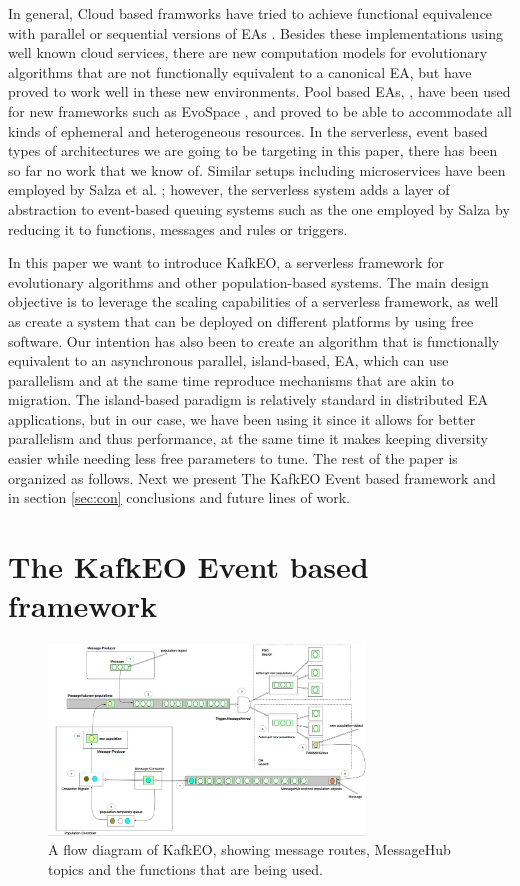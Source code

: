 \documentclass[sigconf]{acmart}
\begin{document}
In general, Cloud based framworks have tried to achieve functional equivalence with parallel or sequential versions of EAs \cite{salza2017ccube,de2017parallel,10.1007/978-3-319-32149-3_46,de2015scalable}. Besides these implementations using well known cloud services, there are new computation models for evolutionary algorithms
that are not functionally equivalent to a canonical EA, but have
proved to work well in these new environments. Pool based EAs,
\cite{bollini1999distributed}, have been used for new
frameworks such as EvoSpace \cite{García-Valdez2015}, and proved to be
able to accommodate all kinds of ephemeral and heterogeneous
resources. In the serverless, event based types of architectures we are going to
be targeting in this paper, there has been so far no work that we know
of. Similar setups including microservices have been employed by Salza et
al. \cite{salza2017ccube}; however, the serverless system adds a layer
of abstraction to event-based queuing systems such as the one employed
by Salza by reducing it to functions, messages and rules or
triggers.

In this paper we want to introduce KafkEO, a serverless framework for
evolutionary algorithms and other population-based systems. The main
design objective is to leverage the scaling capabilities of a
serverless framework, as well as create a system that can be deployed
on different platforms by using free software. Our intention has
also been to create an algorithm that is functionally equivalent to an asynchronous parallel, island-based, EA, which can use parallelism and at the same time reproduce mechanisms that are akin to migration. The island-based
paradigm is relatively standard in distributed EA applications, but in our case,
we have been using it since it allows for better parallelism
and thus performance, at the same time it makes keeping diversity
easier while needing less free parameters to tune.
The rest of the paper is organized as follows. Next we present The KafkEO Event based framework and in section \ref{sec:con} conclusions
and future lines of work.


\section{The KafkEO Event based framework}
\label{sec:methods}
%
\begin{figure}[h!tbp]
\includegraphics[width=0.75\textwidth]{img/kafkEO.png}
\caption{A flow diagram of KafkEO, showing message routes, MessageHub
  topics and the functions that are being used.}
\label{fig:kafkeo2}
\end{figure}
%
\end{document}
